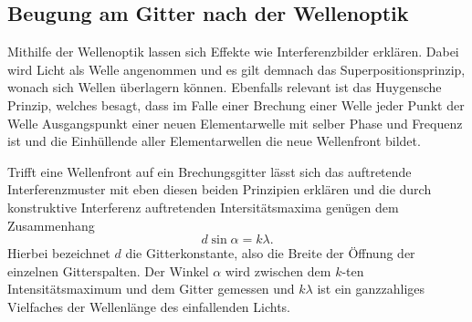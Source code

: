 \subsection{Beugung am Gitter nach der Wellenoptik}
Mithilfe der Wellenoptik lassen sich Effekte wie Interferenzbilder erklären. Dabei wird Licht als Welle angenommen und es gilt
demnach das Superpositionsprinzip, wonach sich Wellen überlagern können.
Ebenfalls relevant ist das Huygensche Prinzip, welches besagt, dass im Falle einer Brechung einer Welle jeder Punkt der Welle 
Ausgangspunkt einer neuen Elementarwelle mit selber Phase und Frequenz ist und die Einhüllende aller Elementarwellen die neue 
Wellenfront bildet.

Trifft eine Wellenfront auf ein Brechungsgitter lässt sich das auftretende Interferenzmuster mit eben diesen beiden Prinzipien
erklären und die durch konstruktive Interferenz auftretenden Intersitätsmaxima genügen dem Zusammenhang
\begin{equation}
    d\sin\alpha = k\lambda. \label{eq:Gitter}
\end{equation}
Hierbei bezeichnet $d$ die Gitterkonstante, also die Breite der Öffnung der einzelnen Gitterspalten. Der Winkel $\alpha$ wird
zwischen dem $k$-ten Intensitätsmaximum und dem Gitter gemessen und $k\lambda$ ist ein ganzzahliges Vielfaches der Wellenlänge
des einfallenden Lichts.
